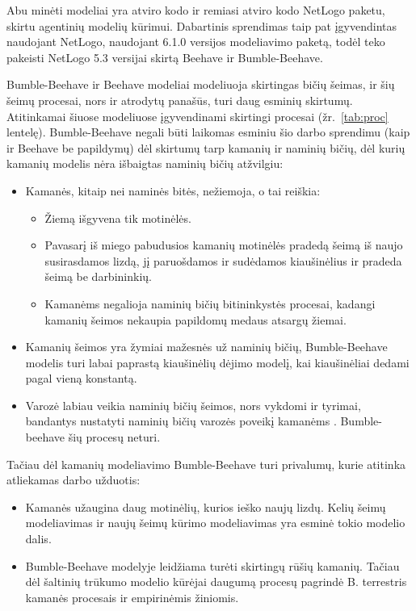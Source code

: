 \documentclass{VUMIFKompMagistrinis}
\begin{document}
Abu minėti modeliai yra atviro kodo ir remiasi atviro kodo NetLogo  paketu, skirtu agentinių modelių kūrimui. Dabartinis sprendimas taip pat įgyvendintas naudojant NetLogo, naudojant 6.1.0 versijos modeliavimo paketą, todėl teko pakeisti NetLogo 5.3 versijai skirtą Beehave ir Bumble-Beehave.

Bumble-Beehave ir Beehave modeliai modeliuoja skirtingas bičių šeimas, ir šių šeimų procesai, nors ir atrodytų panašūs, turi daug esminių skirtumų. Atitinkamai šiuose modeliuose įgyvendinami skirtingi procesai (žr.~\ref{tab:proc} lentelę).
Bumble-Beehave negali būti laikomas esminiu šio darbo sprendimu (kaip ir Beehave be papildymų) dėl skirtumų tarp kamanių ir naminių bičių, dėl kurių kamanių modelis nėra išbaigtas naminių bičių atžvilgiu:
\begin{itemize}
\item Kamanės, kitaip nei naminės bitės, nežiemoja, o tai reiškia:
\begin{itemize}
\item Žiemą išgyvena tik motinėlės.
\item Pavasarį iš miego pabudusios kamanių motinėlės pradedą šeimą iš naujo susirasdamos lizdą, jį paruošdamos ir sudėdamos kiaušinėlius ir pradeda šeimą be darbininkių. 
\item Kamanėms negalioja naminių bičių bitininkystės procesai, kadangi kamanių šeimos nekaupia papildomų medaus atsargų žiemai.
\end{itemize}
\item Kamanių šeimos yra žymiai mažesnės už naminių bičių, Bumble-Beehave modelis turi labai paprastą kiaušinėlių dėjimo modelį, kai kiaušinėliai dedami pagal vieną konstantą.
\item Varozė labiau veikia naminių bičių šeimos, nors vykdomi ir tyrimai, bandantys nustatyti naminių bičių varozės poveikį kamanėms \cite{MTD19}. Bumble-beehave šių procesų neturi. 
\end{itemize}

Tačiau dėl kamanių modeliavimo Bumble-Beehave turi privalumų, kurie atitinka atliekamas darbo užduotis:
\begin{itemize}
\item Kamanės užaugina daug motinėlių, kurios ieško naujų lizdų. Kelių šeimų modeliavimas ir naujų šeimų kūrimo modeliavimas yra esminė tokio modelio dalis.
\item Bumble-Beehave modelyje leidžiama turėti skirtingų rūšių kamanių. Tačiau dėl šaltinių trūkumo modelio kūrėjai daugumą procesų pagrindė B. terrestris kamanės procesais ir empirinėmis žiniomis.
\end{itemize}
\end{document}
